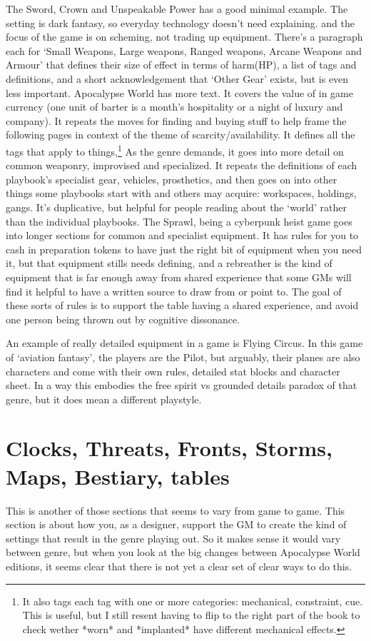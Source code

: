 \documentclass{tufte-handout}
\begin{document}
The Sword, Crown and Unspeakable Power has a good minimal example. The setting is dark fantasy, so everyday technology doesn't need explaining. and the focus of the game is on scheming, not trading up equipment. There's a paragraph each for `Small Weapons, Large weapons, Ranged weapons, Arcane Weapons and Armour' that defines their size of effect in terms of harm(HP), a list of tags and definitions, and a short acknowledgement that `Other Gear' exists, but is even less important. 
Apocalypse World has more text. It covers the value of in game currency (one unit of barter is a month's hospitality or a night of luxury and company). It repeats the moves for finding and buying stuff to help frame the following pages in context of the theme of scarcity/availability. It defines all the tags that apply to things,\footnote{It also tags each tag with one or more categories: mechanical, constraint, cue. This is useful, but I still resent having to flip to the right part of the book to check wether *worn* and *implanted* have different mechanical effects.} As the genre demands, it goes into more detail on common weaponry, improvised and specialized. It repeats the definitions of each playbook's specialist gear, vehicles, prosthetics,  and then goes on into other things some playbooks start with and others may acquire: workspaces, holdings, gangs. It's duplicative, but helpful for people reading about the `world' rather than the individual playbooks.
The Sprawl, being a cyberpunk heist game goes into longer sections for common and specialist equipment. It has rules for you to cash in preparation tokens to have just the right bit of equipment when you need it, but that equipment stills needs defining, and a rebreather is the kind of equipment that is far enough away from shared experience that some GMs will find it helpful to have a written source to draw from or point to. The goal of these sorts of rules is to support the table having a shared experience, and avoid one person being thrown out by cognitive dissonance.

An example of really detailed equipment in a game is Flying Circus. In this game of `aviation fantasy', the players are the Pilot, but arguably, their planes are also characters and come with their own rules, detailed stat blocks and character sheet. In a way this embodies the free spirit vs grounded details paradox of that genre, but it does mean a different playstyle. 

\section{Clocks, Threats, Fronts, Storms, Maps, Bestiary, tables}
This is another of those sections that seems to vary from game to game. This section is about how you, as a designer, support the GM to create the kind of settings that result in the genre playing out. So it makes sense it would vary between genre, but when you look at the big changes between Apocalypse World editions, it seems clear that there is not yet a clear set of clear ways to do this.
\end{document}
